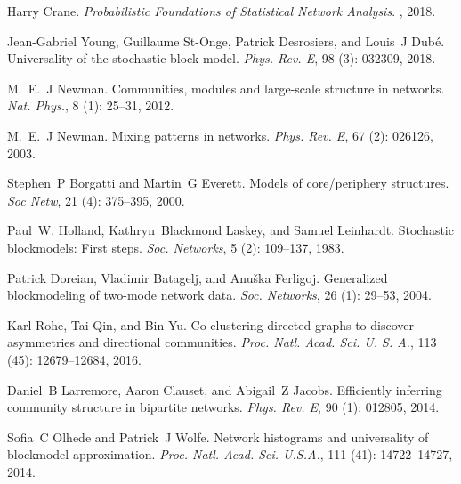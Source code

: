 Harry Crane.
\newblock \emph{Probabilistic Foundations of Statistical Network Analysis}.
, 2018.

Jean-Gabriel Young, Guillaume {St-Onge}, Patrick Desrosiers, and Louis~J
Dub{\'e}.
\newblock Universality of the stochastic block model.
\newblock \emph{Phys. Rev. E}, 98 (3): 032309, 2018.

M.~E.~J Newman.
\newblock Communities, modules and large-scale structure in networks.
\newblock \emph{Nat. Phys.}, 8 (1): 25--31, 2012.

M.~E.~J Newman.
\newblock Mixing patterns in networks.
\newblock \emph{Phys. Rev. E}, 67 (2): 026126,
2003{}.

Stephen~P Borgatti and Martin~G Everett.
\newblock Models of core/periphery structures.
\newblock \emph{Soc Netw}, 21 (4): 375--395, 2000.

Paul~W. Holland, Kathryn~Blackmond Laskey, and Samuel Leinhardt.
\newblock Stochastic blockmodels: {{First}} steps.
\newblock \emph{Soc. Networks}, 5 (2): 109--137, 1983.

Patrick Doreian, Vladimir Batagelj, and Anu{\v s}ka Ferligoj.
\newblock Generalized blockmodeling of two-mode network data.
\newblock \emph{Soc. Networks}, 26 (1): 29--53, 2004.

Karl Rohe, Tai Qin, and Bin Yu.
\newblock Co-clustering directed graphs to discover asymmetries and directional
communities.
\newblock \emph{Proc. Natl. Acad. Sci. U. S. A.}, 113 (45):
12679--12684, 2016.

Daniel~B Larremore, Aaron Clauset, and Abigail~Z Jacobs.
\newblock Efficiently inferring community structure in bipartite networks.
\newblock \emph{Phys. Rev. E}, 90 (1): 012805, 2014.

Sofia~C Olhede and Patrick~J Wolfe.
\newblock Network histograms and universality of blockmodel approximation.
\newblock \emph{Proc. Natl. Acad. Sci. U.S.A.}, 111 (41):
14722--14727, 2014.

